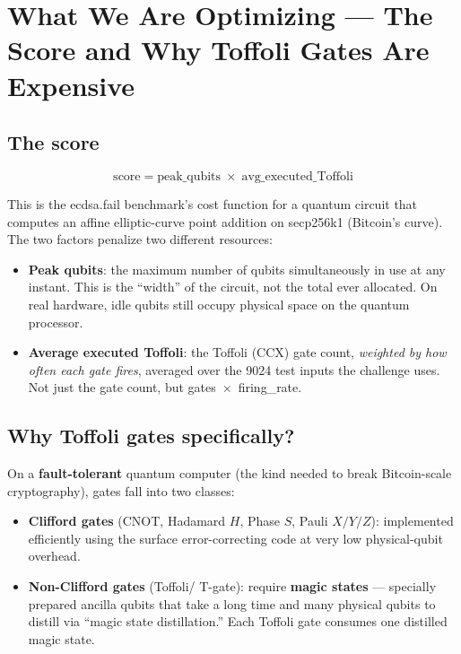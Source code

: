 \documentclass[11pt,a4paper]{article}
\newcommand{\tof}{Toffoli\xspace}
\begin{document}
\section{What We Are Optimizing --- The Score and Why Toffoli Gates Are Expensive}
\label{sec:score}

\subsection{The score}

\begin{tcolorbox}[definitionbox, title=Score objective (lower is better)]
\[
  \text{score} = \text{peak\_qubits} \;\times\; \text{avg\_executed\_Toffoli}
\]
\end{tcolorbox}

This is the ecdsa.fail benchmark's cost function for a quantum circuit that computes an affine
elliptic-curve point addition on secp256k1 (Bitcoin's curve). The two factors penalize two
different resources:

\begin{itemize}
  \item \textbf{Peak qubits}: the maximum number of qubits simultaneously in use at any instant.
    This is the ``width'' of the circuit, not the total ever allocated. On real hardware, idle
    qubits still occupy physical space on the quantum processor.
  \item \textbf{Average executed \tof}: the Toffoli (CCX) gate count, \emph{weighted by how
    often each gate fires}, averaged over the 9024 test inputs the challenge uses. Not just the
    gate count, but gates~$\times$~firing\_rate.
\end{itemize}

\subsection{Why Toffoli gates specifically?}

On a \textbf{fault-tolerant} quantum computer (the kind needed to break Bitcoin-scale
cryptography), gates fall into two classes:

\begin{itemize}
  \item \textbf{Clifford gates} (CNOT, Hadamard $H$, Phase $S$, Pauli $X/Y/Z$): implemented
    efficiently using the surface error-correcting code at very low physical-qubit overhead.
  \item \textbf{Non-Clifford gates} (\tof / T-gate): require \textbf{magic states} --- specially
    prepared ancilla qubits that take a long time and many physical qubits to distill via
    ``magic state distillation.'' Each \tof gate consumes one distilled magic state.
\end{itemize}
\end{document}

